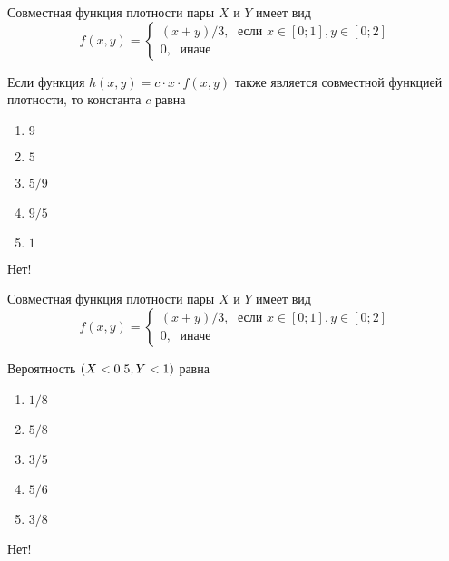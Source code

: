 \documentclass[t]{beamer}
\let\P\relax
\DeclareMathOperator{\P}{\mathbb{P}}
\begin{document}
 \begin{frame} \label{21-No} 
\begin{block}{21} 

Совместная функция плотности пары $X$ и $Y$ имеет вид
\[
f(x,y)=\begin{cases}
(x+y)/3, \; \text{ если } x\in[0;1], y\in [0;2] \\
0, \; \text{ иначе}
\end{cases}
\]

\vspace{0.5cm} 
 
Если функция $h(x,y)=c\cdot x\cdot f(x,y)$ также является совместной функцией плотности, то константа $c$ равна
 


 \end{block} 
\begin{enumerate} 
\item[] \hyperlink{21-No}{\beamergotobutton{} $9$}
\item[] \hyperlink{21-No}{\beamergotobutton{} $5$}
\item[] \hyperlink{21-No}{\beamergotobutton{} $5/9$}
\item[] \hyperlink{21-Yes}{\beamergotobutton{} $9/5$}
\item[] \hyperlink{21-No}{\beamergotobutton{} $1$}
\end{enumerate} 

 \alert{Нет!} 
\end{frame} 


 \begin{frame} \label{22-No} 
\begin{block}{22} 

Совместная функция плотности пары $X$ и $Y$ имеет вид
\[
f(x,y)=\begin{cases}
(x+y)/3, \; \text{ если } x\in[0;1], y\in [0;2] \\
0, \; \text{ иначе}
\end{cases}
\]

\vspace{0.5cm} 
 
 Вероятность $\P(X<0.5, Y<1)$ равна
 


 \end{block} 
\begin{enumerate} 
\item[] \hyperlink{22-Yes}{\beamergotobutton{} $1/8$}
\item[] \hyperlink{22-No}{\beamergotobutton{} $5/8$}
\item[] \hyperlink{22-No}{\beamergotobutton{} $3/5$}
\item[] \hyperlink{22-No}{\beamergotobutton{} $5/6$}
\item[] \hyperlink{22-No}{\beamergotobutton{} $3/8$
}
\end{enumerate} 

 \alert{Нет!} 
\end{frame} 
\end{document}
